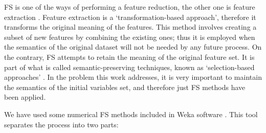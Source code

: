 \documentclass[a4paper,10pt,twocolumn,preprint,3p]{elsarticle}
\begin{document}
FS is one of the ways of performing a feature reduction, the other one is 
feature extraction \cite{kittler1986feature}. 
Feature extraction is a `transformation-based approach', therefore
it transforms the original meaning of the features. This method
involves creating a subset of new features by combining the
existing ones; thus it is employed when the semantics of the
original dataset will not be needed by any future process. On the
contrary, FS attempts to retain the meaning of the
original feature set. It is part of what is called semantic-preserving
techniques, known as `selection-based approaches' \cite{liu1998feature}. 
In the problem this work addresses, it is very important to maintain the 
semantics of the initial variables set, and therefore just FS methods 
have been applied. 

We have used some numerical FS methods included in Weka software \cite{Hall2009,Witten2011}. This tool separates the process into two parts:
\end{document}
